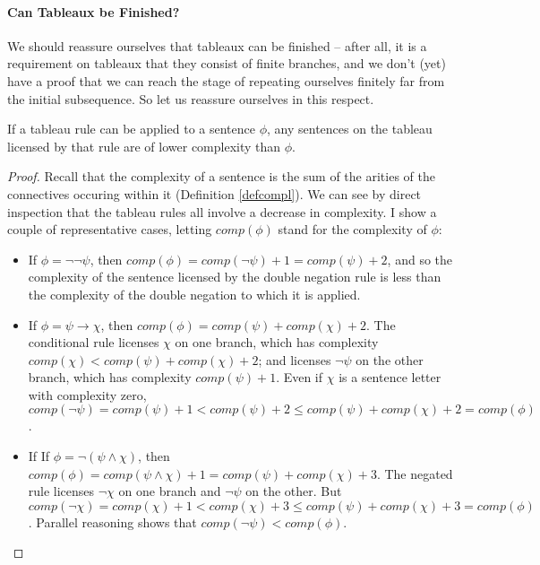 \paragraph{Can Tableaux be Finished?} We should reassure ourselves that tableaux can be finished – after all, it is a requirement on tableaux that they consist of finite branches, and we don't (yet) have a proof that we can reach the stage of repeating ourselves finitely far from the initial subsequence. So let us reassure ourselves in this respect. 

\begin{lemma}\label{rulescomplex}
If a tableau rule can be applied to a sentence $\phi$, any sentences on the tableau licensed by that rule are of lower complexity than $\phi$. \begin{proof}
	Recall that the complexity of a sentence is the sum of the arities of the connectives occuring within it (Definition \ref{defcompl}). We can see by direct inspection that the tableau rules all involve a decrease in complexity. I show a couple of representative cases, letting $comp(\phi)$ stand for the complexity of $\phi$: \begin{itemize}
		\item If $\phi = ¬¬ \psi$, then $comp(\phi)=comp(¬ \psi)+1=comp(\psi)+2$, and so the complexity of the sentence licensed by the double negation rule is less than the complexity of the double negation to which it is applied.
		\item If $\phi= \psi\to \chi$, then $comp(\phi) = comp(\psi)+comp(\chi)+2$. The conditional rule licenses $\chi$ on one branch, which has complexity $comp(\chi)<comp(\psi)+comp(\chi)+2$; and licenses $¬ \psi$ on the other branch, which has complexity $comp(\psi)+1$. Even if $\chi$ is a sentence letter with complexity zero,  $comp(¬\psi) = comp(\psi)+1 < comp(\psi)+ 2 \leqslant comp(\psi)+comp(\chi)+2 = comp(\phi)$.
		\item If  If $\phi= ¬(\psi\wedge \chi)$, then $comp(\phi) = comp(\psi\wedge \chi)+1 = comp(\psi)+comp(\chi)+3$. The negated rule licenses $¬\chi$ on one branch and $¬ \psi$ on the other. But $comp(¬ \chi) = comp(\chi)+1 < comp(\chi)+3 \leqslant comp(\psi)+comp(\chi)+3 = comp(\phi)$. Parallel reasoning shows that $comp(¬ \psi)<comp(\phi)$.
	\end{itemize}
\end{proof}
\end{lemma}

